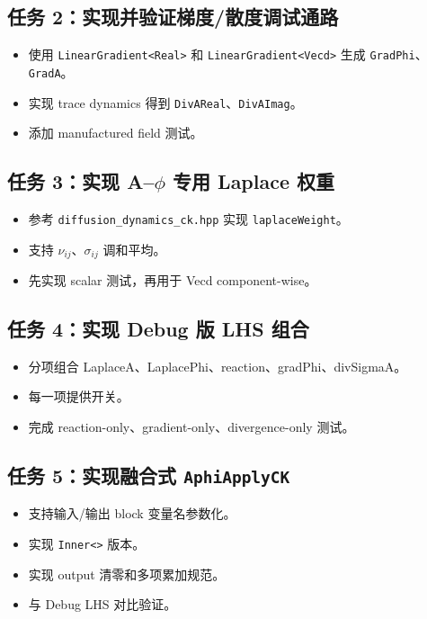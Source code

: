\documentclass[UTF8,a4paper,11pt]{ctexart}
\newcommand{\code}[1]{\texttt{#1}}
\begin{document}
\subsection*{任务 2：实现并验证梯度/散度调试通路}
\begin{itemize}
  \item 使用 \code{LinearGradient<Real>} 和 \code{LinearGradient<Vecd>} 生成 \code{GradPhi}、\code{GradA}。
  \item 实现 trace dynamics 得到 \code{DivAReal}、\code{DivAImag}。
  \item 添加 manufactured field 测试。
\end{itemize}

\subsection*{任务 3：实现 A--$\phi$ 专用 Laplace 权重}
\begin{itemize}
  \item 参考 \code{diffusion\_dynamics\_ck.hpp} 实现 \code{laplaceWeight}。
  \item 支持 $\nu_{ij}$、$\sigma_{ij}$ 调和平均。
  \item 先实现 scalar 测试，再用于 Vecd component-wise。
\end{itemize}

\subsection*{任务 4：实现 Debug 版 LHS 组合}
\begin{itemize}
  \item 分项组合 LaplaceA、LaplacePhi、reaction、gradPhi、divSigmaA。
  \item 每一项提供开关。
  \item 完成 reaction-only、gradient-only、divergence-only 测试。
\end{itemize}

\subsection*{任务 5：实现融合式 \code{AphiApplyCK}}
\begin{itemize}
  \item 支持输入/输出 block 变量名参数化。
  \item 实现 \code{Inner<>} 版本。
  \item 实现 output 清零和多项累加规范。
  \item 与 Debug LHS 对比验证。
\end{itemize}
\end{document}
